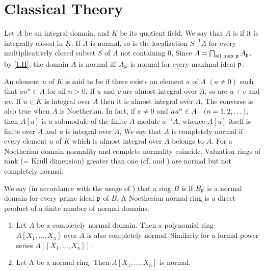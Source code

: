 \documentclass[../main]{subfiles}
\begin{document}
\section{Classical Theory}\label{sec:17}

\newparagraph Let $A$ be an integral domain, and $K$ be its quotient field, We say that $A$ is  if it is integrally closed in $K$. If $A$ is normal, so is the localization $S^{-1}A$ for every multiplicatively closed subset $S$ of $A$ not containing $0$,
Since $A = \bigcap_{\text{all max }\mathfrak{p}} A_{\mathfrak{p}}$. by \ref{1.H}, the domain $A$ is normal iff $A_{\mathfrak{p}}$ is normal for every maximal ideal $\mathfrak{p}$. 

An element $u$ of $K$ is said to be  if there exists an element $a$ of $A$ $(a\neq 0)$ such that $au^n \in A$ for all $n>0$. If $u$ and $v$ are almost integral over $A$, so are $u+v$ and $uv$. If $u\in K$ is integral over $A$ then it is almost
integral over $A$, The converse is also true when $A$ is Noetherian. In fact, if $a\neq 0$ and $au^n\in A\for{n=1,2,\dots}$, then $A[u]$ is a submodule of the finite $A$-module $a^{-1}A$, whence $A[u]$ itself is finite over $A$ and $u$ is integral over $A$, We say that $A$ is completely normal if every element $u$ of $K$ which is
almost integral over $A$ belongs to $A$. For a Noetherian domain normality and complete normality coincide. Valuation rings of rank (= Krull dimension) greater than one (cf.\cite{nagata1975local} and \cite{zariski2014commutative}) are normal but not completely normal. 

We say (in accordance with the usage of \cite{egaIII}) that a ring $B$ is  if $B_{\mathfrak{p}}$ is a normal domain for every prime ideal $\mathfrak{p}$ of $B$. A Noetherian normal ring is a direct product of a finite number of normal domains.

\begin{parproposition}
\begin{enumerate}[label=(\arabic*)]
    \item Let $A$ be a completely normal domain. Then a polynomial ring $A[X_1,\dots,X_n]$ over $A$ is also completely normal. Similarly for a formal power series $A[[X_1,\dots,X_n]]$. 
    \item Let A be a normal ring. Then $A[X_1,\dots,X_n]$ is normal.
\end{enumerate}
\end{parproposition}
\end{document}
